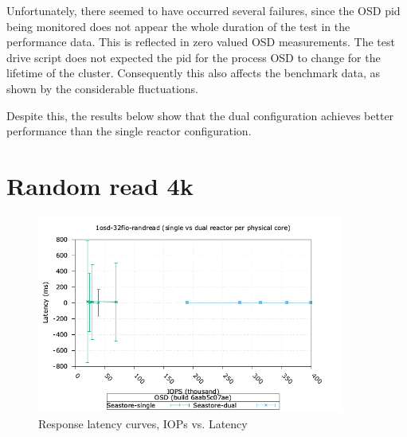 Unfortunately, there seemed to have occurred several failures, since the OSD
pid being monitored does not appear the whole duration of the test in the
performance data. This is reflected in zero valued OSD measurements. The test
drive script does not expected the pid for the process OSD to change for the
lifetime of the cluster. Consequently this also affects the benchmark data, as
shown by the considerable fluctuations.

Despite this, the results below show that the dual configuration achieves
better performance than the single reactor configuration. 
\pagebreak
\section{Random read 4k}

\begin{figure}[!ht]
  \centering
  \includegraphics[width=0.9\textwidth]{seastore_1osd_32fio_randread_iops_vs_lat.png}
  \caption{Response latency curves, IOPs vs. Latency}
\end{figure}

%
